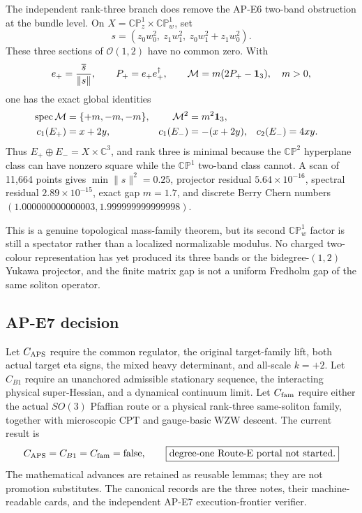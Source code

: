 \documentclass[11pt]{article}
\numberwithin{equation}{section}
\newcommand{\CP}{\mathbb{CP}}
\newcommand{\CC}{\mathbb C}
\newcommand{\cO}{\mathcal O}
\begin{document}
The independent rank-three branch does remove the AP-E6 two-band obstruction
at the bundle level.  On
\(X=\CP^1_z\times\CP^1_w\), set
\begin{equation}
 s=(z_0w_0^2,\ z_1w_1^2,\ z_0w_1^2+z_1w_0^2).
 \label{eq:e7-rank-three-sections}
\end{equation}
These three sections of \(\cO(1,2)\) have no common zero.  With
\begin{equation}
 e_+=\frac{\overline s}{\|s\|},\qquad
 P_+=e_+e_+^\dagger,\qquad
 {\cal M}=m(2P_+-\bm1_3),\quad m>0,
 \label{eq:e7-rank-three-mass}
\end{equation}
one has the exact global identities
\begin{align}
 \operatorname{spec}{\cal M}&=\{+m,-m,-m\},&{\cal M}^2&=m^2\bm1_3,
 \nonumber\\
 c_1(E_+)&=x+2y,&c_1(E_-)&=-(x+2y),&c_2(E_-)&=4xy.
 \label{eq:e7-rank-three-chern}
\end{align}
Thus \(E_+\oplus E_-=X\times\CC^3\), and rank three is minimal because the
\(\CP^2\) hyperplane class can have nonzero square while the \(\CP^1\)
two-band class cannot.  A scan of 11,664 points gives
\(\min\|s\|^2=0.25\), projector residual \(5.64\times10^{-16}\), spectral
residual \(2.89\times10^{-15}\), exact gap \(m=1.7\), and discrete Berry
Chern numbers \((1.000000000000003,1.999999999999998)\).

This is a genuine topological mass-family theorem, but its second
\(\CP^1_w\) factor is still a spectator rather than a localized normalizable
modulus.  No charged two-colour representation has yet produced its three
bands or the bidegree-\((1,2)\) Yukawa projector, and the finite matrix gap is
not a uniform Fredholm gap of the same soliton operator.

\subsection{AP-E7 decision}

Let \(C_{\rm APS}\) require the common regulator, the original target-family
lift, both actual target eta signs, the mixed heavy determinant, and all-scale
\(k=+2\).  Let \(C_{B1}\) require an unanchored admissible stationary sequence,
the interacting physical super-Hessian, and a dynamical continuum limit.
Let \(C_{\rm fam}\) require either the actual \(SO(3)\) Pfaffian route or a
physical rank-three same-soliton family, together with microscopic CPT and
gauge-basic WZW descent.  The current result is
\begin{equation}
 C_{\rm APS}=C_{B1}=C_{\rm fam}=\mathrm{false},\qquad
 \boxed{\text{degree-one Route-E portal not started}.}
 \label{eq:e7-final-decision}
\end{equation}
The mathematical advances are retained as reusable lemmas; they are not
promotion substitutes.  The canonical records are the three
 notes, their machine-readable cards, and the
independent AP-E7 execution-frontier verifier.
\end{document}
